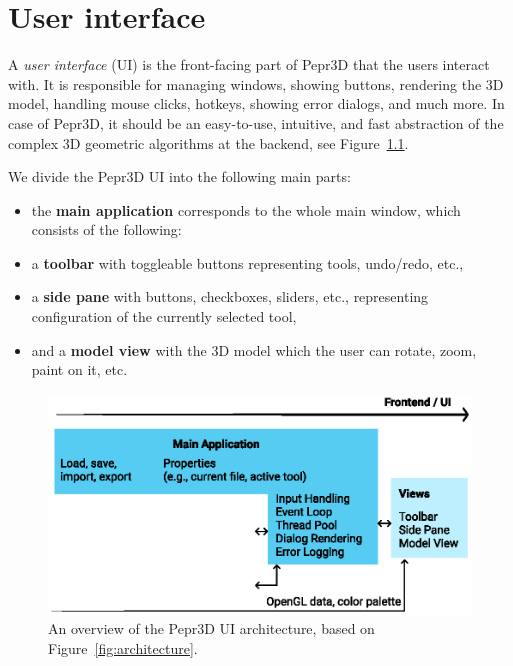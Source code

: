 \chapter{User interface}

A \emph{user interface} (UI) is the front-facing part of Pepr3D that the users interact with.
It is responsible for managing windows, showing buttons, rendering the 3D model, handling mouse clicks, hotkeys, showing error dialogs, and much more.
In case of Pepr3D, it should be an easy-to-use, intuitive, and fast abstraction of the complex 3D geometric algorithms at the backend, see Figure~\ref{fig:diagram_ui}.

\medskip

We divide the Pepr3D UI into the following main parts:
%
\begin{itemize}
\setlength\itemsep{0em}
\item the \textbf{main application} corresponds to the whole main window, which consists of the following:
\item a \textbf{toolbar} with toggleable buttons representing tools, undo/redo, etc.,
\item a \textbf{side pane} with buttons, checkboxes, sliders, etc., representing configuration of the currently selected tool,
\item and a \textbf{model view} with the 3D model which the user can rotate, zoom, paint on it, etc.
\end{itemize}

\begin{figure}[h]
	\centering
	\centerline{\includegraphics[scale=1.0]{images/diagram_ui.eps}}
	\caption{An overview of the Pepr3D UI architecture, based on Figure~\ref{fig:architecture}.}
	\label{fig:diagram_ui}
\end{figure}
\vspace{-1.5em}

